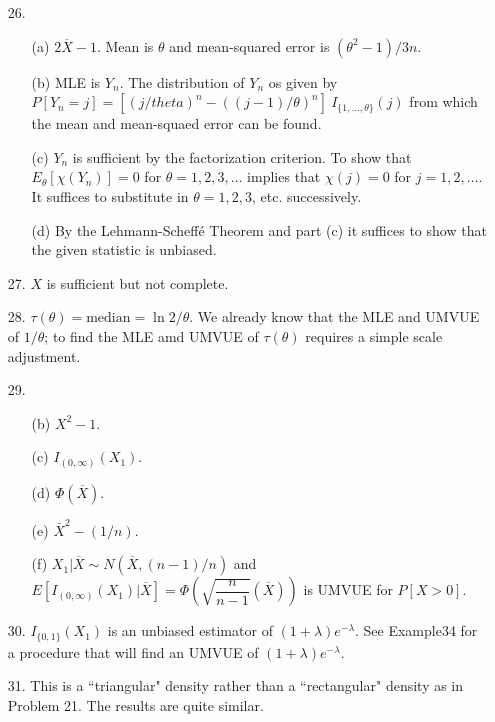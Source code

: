\begin{enumerate}
	\item[26.] \begin{enumerate}
	 	\item[(a)] $2\overline{X}-1$. Mean is $\theta$ and mean-squared error is $(\theta^2-1)/3n$.
	 	\item[(b)] MLE is $Y_n$. The distribution of $Y_n$ os given by $P[Y_n=j] = [(j/theta)^n - ((j-1)/\theta)^n]\ I_{\{1,\ldots,\theta\}}(j)$ from which the mean and mean-squaed error can be found.
	 	\item[(c)] $Y_n$ is sufficient by the factorization criterion. To show that $E_\theta[\chi(Y_n)] = 0$ for $\theta = 1, 2, 3, \ldots$ implies that $\chi(j)=0$ for $j=1,2,\ldots$. It suffices to substitute in $\theta = 1, 2, 3$, etc. successively.
	 	\item[(d)] By the Lehmann-Scheff\'e Theorem and part (c) it suffices to show that the given statistic is unbiased.
	 \end{enumerate}
 
 	\item[27.] $X$ is sufficient but not complete.

	\item[28.] $\tau(\theta) = \mbox{median} = \ln 2/\theta$. We already know that the MLE and UMVUE of $1/\theta$; to find the MLE amd UMVUE of $\tau(\theta)$ requires a simple scale adjustment.	  
	
	\item[29.] \begin{enumerate}
		\item[(b)] $X^2 - 1$.
		\item[(c)] $I_{(0,\infty)}(X_1)$.
		
		\newpage
		
		\item[(d)] $\Phi(\overline{X})$.
		\item[(e)] $\overline{X}^2 - (1/n)$.
		\item[(f)] $X_1\vert\overline{X} \sim N(\overline{X},(n-1)/n)$ and $E[I_{(0,\infty)}(X_1)\vert \overline{X}] = \Phi\left(\sqrt{\dfrac{n}{n-1}}(\overline{X})\right)$ is UMVUE for $P[X>0]$.
	\end{enumerate} 
	
	\item[30.] $I_{\{0,1\}}(X_1)$ is an unbiased estimator of $(1+\lambda)e^{-\lambda}$.  See Example34 for a procedure that will find an UMVUE of $(1+\lambda)e^{-\lambda}$.
	
	\item[31.] This is a ``triangular" density rather than a ``rectangular" density as in Problem 21.  The results are quite similar.  
	

\end{enumerate}
